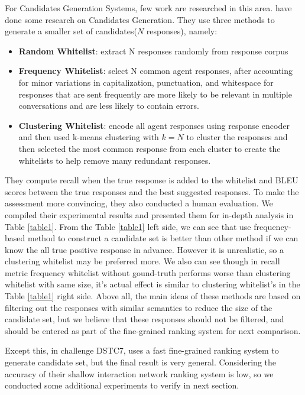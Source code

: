 \documentclass{article}
\begin{document}
For Candidates Generation Systems, few work are researched in this area. \cite{swanson2019building} have done some research on Candidates Generation. They use three methods to generate a smaller set of candidates($N$ responses), namely:

\begin{itemize}
	\item \textbf{Random Whitelist}: extract N responses randomly from response corpus
	\item \textbf{Frequency Whitelist}: select N common agent responses, after accounting for minor variations in capitalization, punctuation, and whitespace for responses that are sent frequently are more likely to be relevant in multiple conversations and are less likely to contain errors.
	\item \textbf{Clustering Whitelist}: encode all agent responses using response encoder and then used k-means clustering with $k=N$ to cluster the responses and then selected the most common response from each cluster to create the whitelists to help remove many redundant responses.
\end{itemize}

They compute recall when the true response is added to the whitelist and BLEU scores between the true responses and the best suggested responses. To make the assessment more convincing, they also conducted a human evaluation. We compiled their experimental results and presented them for in-depth analysis in Table \ref{table1}. From the Table \ref{table1} left side, we can see that use frequency-based method to construct a candidate set is better than other method if we can know the all true positive response in advance. However it is unrealistic, so a clustering whitelist may be preferred more. We also can see though in recall metric frequency whitelist without gound-truth performs worse than clustering whitelist with same size, it's actual effect is similar to clustering whitelist's in the Table \ref{table1} right side. Above all, the main ideas of these methods are based on filtering out the responses with similar semantics to reduce the size of the candidate set, but we believe that these responses should not be filtered, and should be entered as part of the fine-grained ranking system for next comparison.

Except this, in challenge DSTC7, \cite{chen2019sequential} uses a fast fine-grained ranking system to generate candidate set, but the final result is very general. Considering the accuracy of their shallow interaction network ranking system is low, so we conducted some additional experiments to verify in next section.
\end{document}
